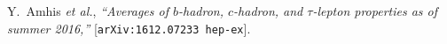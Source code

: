 \documentclass{PoS}
\begin{document}
\begin{thebibliography}{99}
  Y.~Amhis {\it et al.},
  \emph{``Averages of $b$-hadron, $c$-hadron, and $\tau$-lepton properties as of summer 2016,''}
  [{\tt arXiv:1612.07233 hep-ex}].




\end{thebibliography}
  
\end{document}
